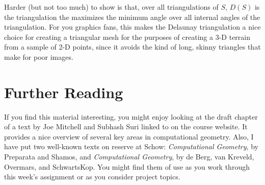 \documentclass[11pt]{article}
\begin{document}
Harder (but not too much) to show is that, over all triangulations of $S$, $D(S)$ is the triangulation the maximizes
the minimum angle over all internal angles of the triangulation. For you graphics fans, this makes the Delaunay
triangulation a nice choice for creating a triangular mesh for the purposes of creating a 3-D terrain from a sample
of 2-D points, since it avoids the kind of long, skinny triangles that make for poor images.

\section{Further Reading}
If you find this material interesting, you might enjoy looking at the draft chapter of a text by Joe Mitchell and Subhash
Suri linked to on the course website. It provides a nice overview of several key areas in computational geometry.
Also, I have put two well-known texts on reserve at Schow: {\em Computational Geometry}, by
Preparata and Shamos, and {\em Computational Geometry}, by de Berg, van Kreveld, Overmars, and SchwartsKop.
You might find them of use as you work through this week's assignment or as you consider project topics.
\end{document}
